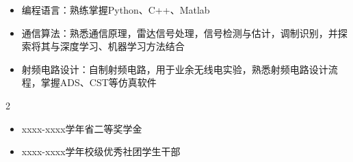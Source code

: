 \vspace{0.5em}
\begin{itemize}
    \item 编程语言：熟练掌握Python、C++、Matlab
    \item 通信算法：熟悉通信原理，雷达信号处理，信号检测与估计，调制识别，并探索将其与深度学习、机器学习方法结合
    \item 射频电路设计：自制射频电路，用于业余无线电实验，熟悉射频电路设计流程，掌握ADS、CST等仿真软件
\end{itemize}

\vspace{-1.5em}
\setlength{\multicolsep}{0pt}
\begin{multicols}{2}
    \begin{itemize}
        \item xxxx-xxxx学年省二等奖学金
        \item xxxx-xxxx学年校级优秀社团学生干部
    \end{itemize}
\end{multicols}


